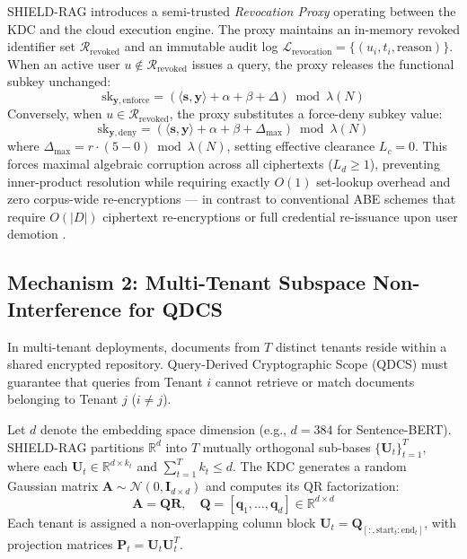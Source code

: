 \documentclass[10pt,a4paper]{article}
\begin{document}
SHIELD-RAG introduces a semi-trusted \textit{Revocation Proxy} operating between the KDC and the cloud execution engine. The proxy maintains an in-memory revoked identifier set $\mathcal{R}_{\text{revoked}}$ and an immutable audit log $\mathcal{L}_{\text{revocation}} = \{(u_i, t_i, \text{reason})\}$. When an active user $u \notin \mathcal{R}_{\text{revoked}}$ issues a query, the proxy releases the functional subkey unchanged:
\begin{equation}
    \text{sk}_{\mathbf{y}, \text{enforce}} = \left(\langle \mathbf{s}, \mathbf{y} \rangle + \alpha + \beta + \Delta\right) \bmod \lambda(N)
\end{equation}
Conversely, when $u \in \mathcal{R}_{\text{revoked}}$, the proxy substitutes a force-deny subkey value:
\begin{equation}
    \text{sk}_{\mathbf{y}, \text{deny}} = \left(\langle \mathbf{s}, \mathbf{y} \rangle + \alpha + \beta + \Delta_{\text{max}}\right) \bmod \lambda(N)
\end{equation}
where $\Delta_{\text{max}} = r \cdot (5 - 0) \bmod \lambda(N)$, setting effective clearance $L_c = 0$. This forces maximal algebraic corruption across all ciphertexts ($L_d \ge 1$), preventing inner-product resolution while requiring exactly $O(1)$ set-lookup overhead and zero corpus-wide re-encryptions — in contrast to conventional ABE schemes that require $O(|D|)$ ciphertext re-encryptions or full credential re-issuance upon user demotion \cite{ge2024attributebased}.

\subsection{Mechanism 2: Multi-Tenant Subspace Non-Interference for QDCS}
In multi-tenant deployments, documents from $T$ distinct tenants reside within a shared encrypted repository. Query-Derived Cryptographic Scope (QDCS) must guarantee that queries from Tenant $i$ cannot retrieve or match documents belonging to Tenant $j$ ($i \neq j$).

Let $d$ denote the embedding space dimension (e.g., $d=384$ for Sentence-BERT). SHIELD-RAG partitions $\mathbb{R}^d$ into $T$ mutually orthogonal sub-bases $\{\mathbf{U}_t\}_{t=1}^T$, where each $\mathbf{U}_t \in \mathbb{R}^{d \times k_t}$ and $\sum_{t=1}^T k_t \le d$. The KDC generates a random Gaussian matrix $\mathbf{A} \sim \mathcal{N}(0, \mathbf{I}_{d \times d})$ and computes its QR factorization:
\begin{equation}
    \mathbf{A} = \mathbf{Q}\mathbf{R}, \quad \mathbf{Q} = [\mathbf{q}_1, \dots, \mathbf{q}_d] \in \mathbb{R}^{d \times d}
\end{equation}
Each tenant is assigned a non-overlapping column block $\mathbf{U}_t = \mathbf{Q}_{[:, \text{start}_t : \text{end}_t]}$, with projection matrices $\mathbf{P}_t = \mathbf{U}_t \mathbf{U}_t^T$.
\end{document}
